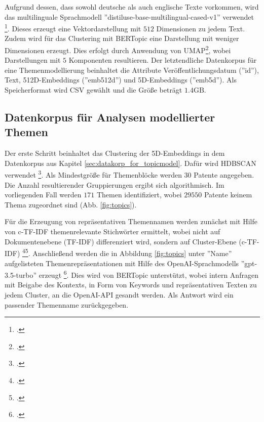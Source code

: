 Aufgrund dessen, dass sowohl deutsche als auch englische Texte vorkommen, wird das multilinguale Sprachmodell ''distiluse-base-multilingual-cased-v1'' verwendet \footcite{website:st_bert_models}. Dieses erzeugt eine Vektordarstellung mit $512$ Dimensionen zu jedem Text. Zudem wird für das Clustering mit BERTopic eine Darstellung mit weniger Dimensionen erzeugt. Dies erfolgt durch Anwendung von \ac{UMAP}\footcite{umap}, wobei Darstellungen mit $5$ Komponenten resultieren. Der letztendliche Datenkorpus für eine Themenmodellierung beinhaltet die Attribute Veröffentlichungsdatum (''id''), Text, 512D-Embeddings (''emb512d'') und 5D-Embeddings (''emb5d''). Als Speicherformat wird CSV gewählt und die Größe beträgt $1.4\text{GB}$.

\subsection{Datenkorpus für Analysen modellierter Themen}\label{sec:topic_modeling}

Der erste Schritt beinhaltet das Clustering der 5D-Embeddings in dem Datenkorpus aus Kapitel \ref{sec:datakorp_for_topicmodel}. Dafür wird \ac{HDBSCAN} verwendet \footcite{hdbscan}. Als Mindestgröße für Themenblöcke werden $30$ Patente angegeben. Die Anzahl resultierender Gruppierungen ergibt sich algorithmisch. Im vorliegenden Fall werden $171$ Themen identifiziert, wobei $29550$ Patente keinem Thema zugeordnet sind (Abb. \ref{fig:topics}). 

Für die Erzeugung von repräsentativen Themennamen werden zunächst mit Hilfe von \ac{c-TF-IDF} themenrelevante Stichwörter ermittelt, wobei nicht auf Dokumentenebene (\ac{TF-IDF}) differenziert wird, sondern auf Cluster-Ebene (\ac{c-TF-IDF}) \footcite{website:bertopic_ctfidf}\footcite{tfidf}. Anschließend werden die in Abbildung \ref{fig:topics} unter ''Name'' aufgelisteten Themenrepräsentationen mit Hilfe des OpenAI-Sprachmodells ''gpt-3.5-turbo'' erzeugt \footcite{website:bertopic_llm}. Dies wird von BERTopic unterstützt, wobei intern Anfragen mit Beigabe des Kontexts, in Form von Keywords und repräsentativen Texten zu jedem Cluster, an die OpenAI-API gesandt werden. Als Antwort wird ein passender Themenname zurückgegeben.

